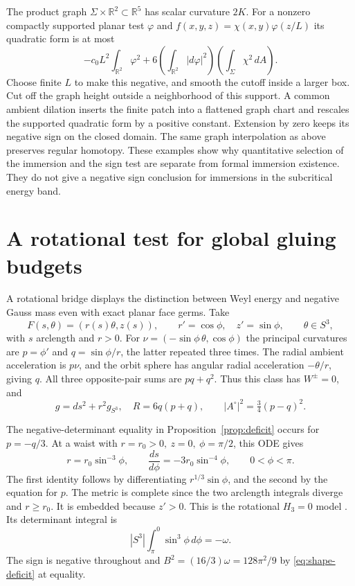 \documentclass[11pt,letterpaper]{article}
\numberwithin{equation}{section}
\newcommand{\R}{\mathbb R}
\begin{document}
The product graph \(\Sigma\times\R^2\subset\R^5\)
has scalar curvature \(2K\). For a nonzero compactly
supported planar test \(\varphi\) and \(f(x,y,z)=
\chi(x,y)\varphi(z/L)\) its quadratic form is at most
\[
 -c_0L^2\int_{\R^2}\varphi^2
       +6\left(\int_{\R^2}|d\varphi|^2\right)
          \left(\int_\Sigma\chi^2\,dA\right).
\]
Choose finite \(L\) to make this negative, and smooth the
cutoff inside a larger box. Cut off the graph height
outside a neighborhood of this support. A common ambient
dilation inserts the finite patch into a flattened
graph chart and rescales the supported quadratic form
by a positive constant. Extension by zero keeps its
negative sign on the closed domain. The same graph
interpolation as above preserves regular homotopy.
These examples show why quantitative selection of the
immersion and the sign test are separate from formal
immersion existence. They do not give a negative
sign conclusion for immersions in the subcritical energy band.

\section{A rotational test for global gluing budgets}\label{sec:rotational}

A rotational bridge displays the distinction between Weyl
energy and negative Gauss mass even with exact planar face
germs. Take
\[
 F(s,\theta)=(r(s)\theta,z(s)),\qquad
 r'=\cos\phi,\quad z'=\sin\phi,\qquad \theta\in S^3 ,
\]
with \(s\) arclength and \(r>0\). For
\(\nu=(-\sin\phi\,\theta,\cos\phi)\) the principal curvatures
are \(p=\phi'\) and \(q=\sin\phi/r\), the latter repeated
three times. The radial ambient acceleration is \(p\nu\),
and the orbit sphere has angular radial acceleration
\(-\theta/r\), giving \(q\). All three opposite-pair sums
are \(pq+q^2\). Thus this class has \(W^\pm=0\), and
\[
 g=ds^2+r^2 g_{S^3},\quad
 R=6q(p+q),\qquad |A^\circ|^2=\tfrac34(p-q)^2.
\]

The negative-determinant equality in
Proposition~\ref{prop:deficit} occurs for \(p=-q/3\).
At a waist with \(r=r_0>0,\ z=0,\ \phi=\pi/2\), this
ODE gives
\[
 r=r_0\sin^{-3}\phi,\qquad
 \frac{ds}{d\phi}=-3r_0\sin^{-4}\phi,\qquad 0<\phi<\pi.
\]
The first identity follows by differentiating
\(r^{1/3}\sin\phi\), and the second by the equation for \(p\).
The metric is complete since the two arclength integrals
diverge and \(r\ge r_0\). It is embedded because \(z'>0\).
This is the rotational \(H_3=0\) model
\cite[\S1.2.1, equation (7) and Theorem~2(ii)]{Palmas1999RotationHypersurfaces}.
Its determinant integral is
\[
 |S^3|\int_\pi^0\sin^3\phi\,d\phi=-\omega.
\]
The sign is negative throughout and
\(B^2=(16/3)\omega=128\pi^2/9\) by
\eqref{eq:shape-deficit} at equality.
\end{document}

